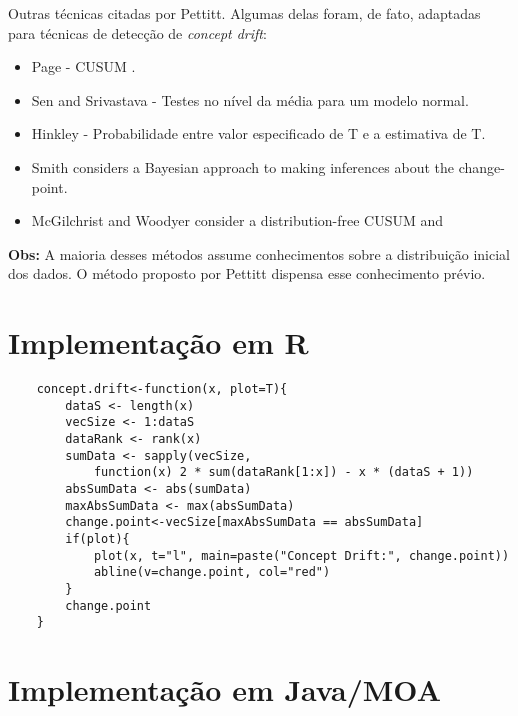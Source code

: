 \documentclass[qual, classic, a4paper]{ufbathesis}
\begin{document}
Outras técnicas citadas por Pettitt. Algumas delas foram, de fato, adaptadas para
técnicas de detecção de \textit{concept drift}:

\begin{itemize}
	\item Page - CUSUM \cite{Page}.

	\item Sen and Srivastava \cite{Sen_and_Srivastava} - Testes no nível da média para um modelo normal.

	\item Hinkley \cite{Hinkley} - Probabilidade entre valor especificado de T e a estimativa de T.

	\item Smith \cite{Smith} considers a Bayesian approach to making inferences about the change-point.

	\item McGilchrist and Woodyer \cite{McGilchrist_and_Woodyer} consider a distribution-free CUSUM and
\end{itemize}

\textbf{Obs:} A maioria desses métodos assume conhecimentos sobre a distribuição inicial dos dados.
O método proposto por Pettitt dispensa esse conhecimento prévio.

\section{Implementação em R}

\begin{verbatim}
    concept.drift<-function(x, plot=T){
        dataS <- length(x)
        vecSize <- 1:dataS
        dataRank <- rank(x)
        sumData <- sapply(vecSize, 
            function(x) 2 * sum(dataRank[1:x]) - x * (dataS + 1))
        absSumData <- abs(sumData)
        maxAbsSumData <- max(absSumData)
        change.point<-vecSize[maxAbsSumData == absSumData]
        if(plot){
            plot(x, t="l", main=paste("Concept Drift:", change.point))
            abline(v=change.point, col="red")
        }
        change.point
    }    
\end{verbatim}

\section{Implementação em Java/MOA}
\end{document}
